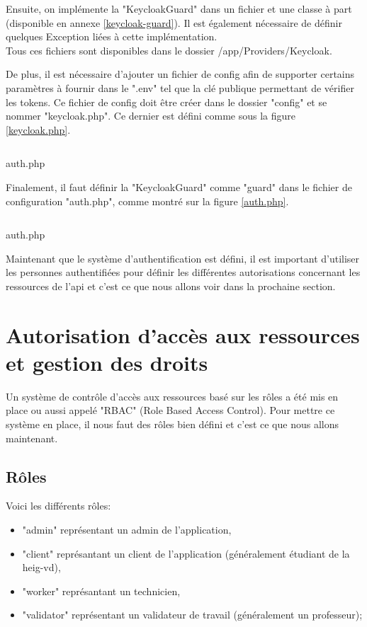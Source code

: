 \documentclass[
    iai, %
    il, %
]{heig-tb}
\begin{document}
Ensuite, on implémente la "KeycloakGuard" dans un fichier et une classe à part (disponible en annexe \ref{keycloak-guard}). Il est également nécessaire de définir quelques Exception liées à cette implémentation. \\
Tous ces fichiers sont disponibles dans le dossier /app/Providers/Keycloak.

De plus, il est nécessaire d'ajouter un fichier de config afin de supporter certains paramètres à fournir dans le ".env" tel que la clé publique permettant de vérifier les tokens. Ce fichier de config doit être créer dans le dossier "config" et se nommer "keycloak.php". Ce dernier est défini comme sous la figure \ref{keycloak.php}.

\begin{listing}[h]
    \inputminted{php}{assets/code/keycloak.php}
    \caption{auth.php \label{keycloak.php}}
\end{listing}

Finalement, il faut définir la "KeycloakGuard" comme "guard" dans le fichier de configuration "auth.php", comme montré sur la figure \ref{auth.php}.

\begin{listing}[h]
    \inputminted{php}{assets/code/auth.php}
    \caption{auth.php \label{auth.php}}
\end{listing}

Maintenant que le système d'authentification est défini, il est important d'utiliser les personnes authentifiées pour définir les différentes autorisations concernant les ressources de l'\Gls{api} et c'est ce que nous allons voir dans la prochaine section.

\section{Autorisation d'accès aux ressources et gestion des droits}

Un système de contrôle d'accès aux ressources basé sur les rôles a été mis en place ou aussi appelé "RBAC" (Role Based Access Control).
Pour mettre ce système en place, il nous faut des rôles bien défini et c'est ce que nous allons maintenant.

\subsection{Rôles}
Voici les différents rôles:
\begin{itemize}
    \item "admin" représentant un admin de l'application,
    \item "client" représantant un client de l'application (généralement étudiant de la \Gls{heig-vd}),
    \item "worker" représantant un technicien,
    \item "validator" représentant un validateur de travail (généralement un professeur);
\end{itemize}
\end{document}
